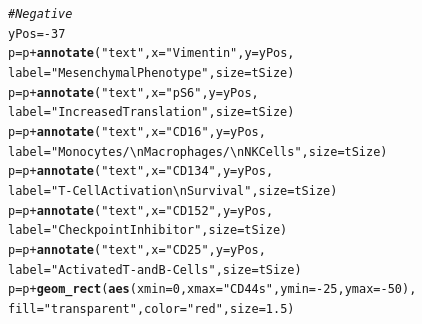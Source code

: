 \documentclass[a4paper]{article}\usepackage[]{graphicx}\usepackage[]{color}
\makeatletter
\newcommand{\hlnum}[1]{\textcolor[rgb]{0.686,0.059,0.569}{#1}}%
\newcommand{\hlstr}[1]{\textcolor[rgb]{0.192,0.494,0.8}{#1}}%
\newcommand{\hlcom}[1]{\textcolor[rgb]{0.678,0.584,0.686}{\textit{#1}}}%
\newcommand{\hlopt}[1]{\textcolor[rgb]{0,0,0}{#1}}%
\newcommand{\hlstd}[1]{\textcolor[rgb]{0.345,0.345,0.345}{#1}}%
\newcommand{\hlkwb}[1]{\textcolor[rgb]{0.69,0.353,0.396}{#1}}%
\newcommand{\hlkwc}[1]{\textcolor[rgb]{0.333,0.667,0.333}{#1}}%
\newcommand{\hlkwd}[1]{\textcolor[rgb]{0.737,0.353,0.396}{\textbf{#1}}}%
\newenvironment{kframe}{%
 \def\at@end@of@kframe{}%
 \ifinner\ifhmode%
  \def\at@end@of@kframe{\end{minipage}}%
  \begin{minipage}{\columnwidth}%
 \fi\fi%
 \def\FrameCommand##1{\hskip\@totalleftmargin \hskip-\fboxsep
 \colorbox{shadecolor}{##1}\hskip-\fboxsep
     \hskip-\linewidth \hskip-\@totalleftmargin \hskip\columnwidth}%
 \MakeFramed {\advance\hsize-\width
   \@totalleftmargin\z@ \linewidth\hsize
   \@setminipage}}%
 {\par\unskip\endMakeFramed%
 \at@end@of@kframe}
\newenvironment{knitrout}{}{} %
\makeatother
\begin{document}
\begin{knitrout}
\begin{kframe}
\begin{alltt}
\hlcom{# Negative}
\hlstd{yPos} \hlkwb{=} \hlopt{-}\hlnum{37}
\hlstd{p} \hlkwb{=} \hlstd{p} \hlopt{+} \hlkwd{annotate}\hlstd{(}\hlstr{"text"}\hlstd{,} \hlkwc{x} \hlstd{=} \hlstr{"Vimentin"}\hlstd{,} \hlkwc{y} \hlstd{= yPos,}
                       \hlkwc{label} \hlstd{=} \hlstr{"Mesenchymal Phenotype"}\hlstd{,} \hlkwc{size} \hlstd{= tSize)}
\hlstd{p} \hlkwb{=} \hlstd{p} \hlopt{+} \hlkwd{annotate}\hlstd{(}\hlstr{"text"}\hlstd{,} \hlkwc{x} \hlstd{=} \hlstr{"pS6"}\hlstd{,} \hlkwc{y} \hlstd{= yPos,}
                       \hlkwc{label} \hlstd{=} \hlstr{"Increased Translation"}\hlstd{,} \hlkwc{size} \hlstd{= tSize)}
\hlstd{p} \hlkwb{=} \hlstd{p} \hlopt{+} \hlkwd{annotate}\hlstd{(}\hlstr{"text"}\hlstd{,} \hlkwc{x} \hlstd{=} \hlstr{"CD16"}\hlstd{,} \hlkwc{y} \hlstd{= yPos,}
                       \hlkwc{label} \hlstd{=} \hlstr{"Monocytes/\textbackslash{}n Macrophages/\textbackslash{}n NK Cells"}\hlstd{,} \hlkwc{size} \hlstd{= tSize)}
\hlstd{p} \hlkwb{=} \hlstd{p} \hlopt{+} \hlkwd{annotate}\hlstd{(}\hlstr{"text"}\hlstd{,} \hlkwc{x} \hlstd{=} \hlstr{"CD134"}\hlstd{,} \hlkwc{y} \hlstd{= yPos,}
                       \hlkwc{label} \hlstd{=} \hlstr{"T-Cell Activation\textbackslash{}n Survival"}\hlstd{,} \hlkwc{size} \hlstd{= tSize)}
\hlstd{p} \hlkwb{=} \hlstd{p} \hlopt{+} \hlkwd{annotate}\hlstd{(}\hlstr{"text"}\hlstd{,} \hlkwc{x} \hlstd{=} \hlstr{"CD152"}\hlstd{,} \hlkwc{y} \hlstd{= yPos,}
                       \hlkwc{label} \hlstd{=} \hlstr{"Checkpoint Inhibitor"}\hlstd{,} \hlkwc{size} \hlstd{= tSize)}
\hlstd{p} \hlkwb{=} \hlstd{p} \hlopt{+} \hlkwd{annotate}\hlstd{(}\hlstr{"text"}\hlstd{,} \hlkwc{x} \hlstd{=} \hlstr{"CD25"}\hlstd{,} \hlkwc{y} \hlstd{= yPos,}
                       \hlkwc{label} \hlstd{=} \hlstr{"Activated T- and B-Cells"}\hlstd{,} \hlkwc{size} \hlstd{= tSize)}
\hlstd{p} \hlkwb{=} \hlstd{p} \hlopt{+} \hlkwd{geom_rect}\hlstd{(}\hlkwd{aes}\hlstd{(}\hlkwc{xmin} \hlstd{=} \hlnum{0}\hlstd{,} \hlkwc{xmax} \hlstd{=} \hlstr{"CD44s"}\hlstd{,} \hlkwc{ymin} \hlstd{=} \hlopt{-}\hlnum{25}\hlstd{,} \hlkwc{ymax} \hlstd{=} \hlopt{-}\hlnum{50}\hlstd{),}
               \hlkwc{fill} \hlstd{=} \hlstr{"transparent"}\hlstd{,} \hlkwc{color} \hlstd{=} \hlstr{"red"}\hlstd{,} \hlkwc{size} \hlstd{=} \hlnum{1.5}\hlstd{)}


\end{alltt}
\end{kframe}
\end{knitrout}
\end{document}
